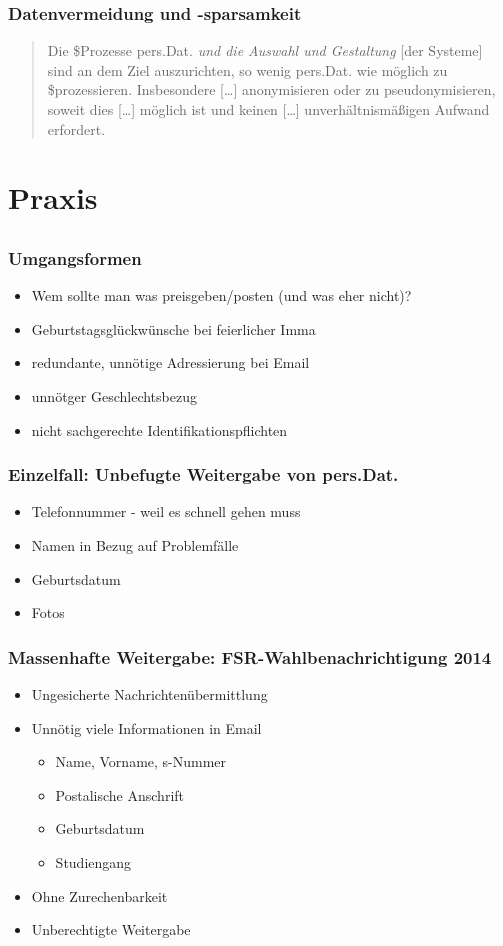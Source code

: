 \documentclass[12pt]{beamer}
\begin{document}
\begin{frame}
	\frametitle{Datenvermeidung und -sparsamkeit}
	\begin{quotation}
		Die \${Prozesse} pers.Dat. \emph{und die Auswahl und Gestaltung} [der Systeme] sind an dem Ziel auszurichten, so wenig pers.Dat. wie möglich zu \${prozessieren}. Insbesondere [\ldots] anonymisieren oder zu pseudonymisieren, soweit dies [\ldots] möglich ist und keinen [\ldots] unverhältnismäßigen Aufwand erfordert.
	\end{quotation}
\end{frame}

\section{Praxis}
\subsection{}

\begin{frame}
	\frametitle{Umgangsformen}
	\begin{itemize}
		\item Wem sollte man was preisgeben/posten (und was eher nicht)?
		\item Geburtstagsglückwünsche bei feierlicher Imma
		\item redundante, unnötige Adressierung bei Email
		\item unnötger Geschlechtsbezug
		\item nicht sachgerechte Identifikationspflichten
	\end{itemize}
\end{frame}

\begin{frame}
	\frametitle{Einzelfall: Unbefugte Weitergabe von pers.Dat.}
	\begin{itemize}
		\item Telefonnummer - weil es schnell gehen muss
		\item Namen in Bezug auf Problemfälle
		\item Geburtsdatum
		\item Fotos
	\end{itemize}
\end{frame}

\begin{frame}
	\frametitle{Massenhafte Weitergabe: FSR-Wahlbenachrichtigung 2014}
	\begin{itemize}
		\item Ungesicherte Nachrichtenübermittlung
		\item Unnötig viele Informationen in Email
		\begin{itemize}
			\item Name, Vorname, s-Nummer
			\item Postalische Anschrift
			\item Geburtsdatum
			\item Studiengang
		\end{itemize}
		\item Ohne Zurechenbarkeit
		\item Unberechtigte Weitergabe
	\end{itemize}
\end{frame}
\end{document}
